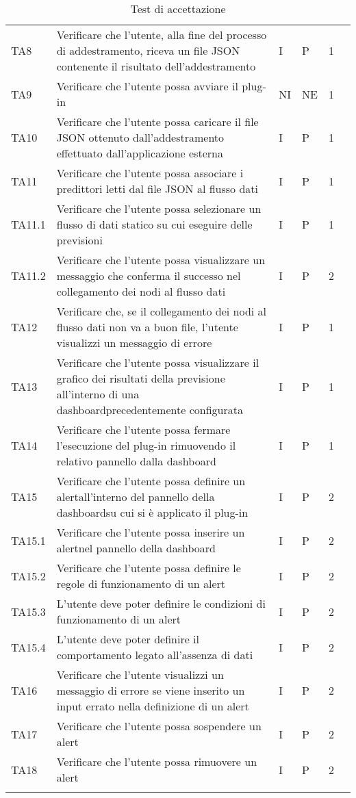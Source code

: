 \begin{longtable} {
	>{}p{12mm}
	>{}p{79.5mm}
	>{}p{9mm}
	>{}p{8mm}
	>{}p{14mm}
	>{}p{0mm}}
	TA8 & Verificare che l'utente, alla fine del processo di addestramento, riceva un file JSON contenente il risultato dell'addestramento & I & P & 1 & \TBstrut \\ [2mm]
	TA9	& Verificare che l'utente possa avviare il plug-in & NI & NE  & 1 & \TBstrut \\ [2mm]
	TA10 & Verificare che l'utente possa caricare il file JSON ottenuto dall'addestramento effettuato dall'applicazione esterna & I & P & 1 & \TBstrut \\ [2mm]
	TA11 & Verificare che l'utente possa associare i predittori letti dal file JSON al flusso dati & I & P & 1 & \TBstrut \\ [2mm]
	TA11.1 & Verificare che l'utente possa selezionare un flusso di dati statico su cui eseguire delle previsioni & I & P & 1 & \TBstrut \\ [2mm]
	TA11.2 & Verificare che l'utente possa visualizzare un messaggio che conferma il successo nel collegamento dei nodi al flusso dati & I & P & 2 & \TBstrut \\ [2mm]
	TA12 & Verificare che, se il collegamento dei nodi al flusso dati non va a buon file, l'utente visualizzi un messaggio di errore & I & P & 1 & \TBstrut \\ [2mm]
	TA13 & Verificare che l'utente possa visualizzare il grafico dei risultati della previsione all'interno di una dashboard\glosp precedentemente configurata & I & P & 1 & \TBstrut \\ [2mm]
	TA14 & Verificare che l'utente possa fermare l'esecuzione del plug-in rimuovendo il relativo pannello dalla dashboard\glo & I & P & 1 & \TBstrut \\ [2mm]
	TA15 & Verificare che l'utente possa definire un alert\glosp all'interno del pannello della dashboard\glosp su cui si è applicato il plug-in & I & P & 2 & \TBstrut \\ [2mm]
	TA15.1 & Verificare che l'utente possa inserire un alert\glosp nel pannello della dashboard\glo & I & P & 2 & \TBstrut \\ [2mm]
	TA15.2 & Verificare che l'utente possa definire le regole di funzionamento di un alert\glo & I & P & 2 & \TBstrut \\ [2mm]
	TA15.3 & L'utente deve poter definire le condizioni di funzionamento di un alert\glo & I & P & 2 & \TBstrut \\ [2mm]
	TA15.4 & L'utente deve poter definire il comportamento legato all'assenza di dati & I & P & 2 & \TBstrut \\ [2mm]
	TA16 & Verificare che l'utente visualizzi un messaggio di errore se viene inserito un input errato nella definizione di un alert\glo & I & P & 2 & \TBstrut \\ [2mm]
	TA17 & Verificare che l'utente possa sospendere un alert\glo & I & P & 2 & \TBstrut \\ [2mm]
	TA18 & Verificare che l'utente possa rimuovere un alert\glo & I & P & 2 & \TBstrut \\ [2mm]
	\rowcolor{white}
	\caption{Test di accettazione}
\end{longtable}

